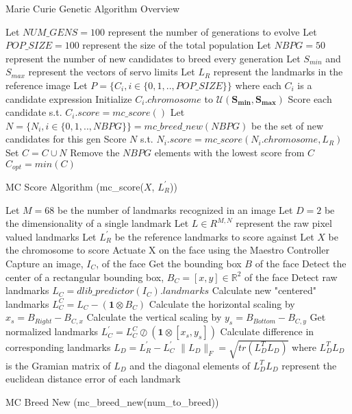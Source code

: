 \documentclass{article}
\begin{document}
\begin{algorithm}
	\caption{Marie Curie Genetic Algorithm Overview} 
    \begin{algorithmic}[1]
        \State Let $NUM\_GENS = 100$ represent the number of generations to evolve
        \State Let $POP\_SIZE = 100$ represent the size of the total population
		\State Let $NBPG = 50$ represent the number of new candidates to breed every generation
		\State Let $S_{min}$ and $S_{max}$ represent the vectors of servo limits
		\State Let $L_R$ represent the landmarks in the reference image
		\State Let $P = \{C_i, i \in \{0, 1, .., POP\_SIZE\}\}$ where each $C_i$ is a candidate expression
			\State Initialize $C_i.chromosome$ to $\mathcal{U}(\bm{S_{min}}, \bm{S_{max}})$
			\State Score each candidate s.t. $C_i.score = mc\_score()$
		\EndFor
			\State Let $N = \{N_i, i \in \{0, 1, ..,NBPG\}\} = mc\_breed\_new(NBPG)$ be the set of new candidates for this gen
			\State Score $N$ s.t. $N_i.score = mc\_score(N_i.chromosome, L_R)$
			\State Set $C = C \cup N$
			\State Remove the $NBPG$ elements with the lowest score from $C$ 
		\EndFor
		\State \Return $C_{opt} = min(C)$
	\end{algorithmic} 
\end{algorithm}

\begin{algorithm}
	\caption{MC Score Algorithm (mc\_score($X$, $L^\prime_R$))} 
	\begin{algorithmic}[1]
		\State Let $M = 68$ be the number of landmarks recognized in an image
		\State Let $D = 2$ be the dimensionality of a single landmark
		\State Let $L \in R^{M, N}$ represent the raw pixel valued landmarks
		\State Let $L^\prime_R$ be the reference landmarks to score against
		\State Let $X$ be the chromosome to score
		\State Actuate X on the face using the Maestro Controller
		\State Capture an image, $I_C$, of the face
		\State Get the bounding box $B$ of the face
		\State Detect the center of a rectangular bounding box, $B_C = [x, y] \in \mathbb{R}^2$ of the face
		\State Detect raw landmarks $L_C = dlib\_predictor(I_C).landmarks$
		\State Calculate new "centered" landmarks $L^C_C = L_C - (\mathbf{1} \otimes B_C)$
		\State Calculate the horizontal scaling by $x_s = B_{Right} - B_{C, x}$
		\State Calculate the vertical scaling by $y_s = B_{Bottom} - B_{C, y}$
		\State Get normalized landmarks $L^\prime_C = L^C_C \oslash (\mathbf{1} \otimes [x_s, y_s])$
		\State Calculate difference in corresponding landmarks $L_D = L^\prime_R - L^\prime_C$
		\State \Return $\| L_D \|_F = \sqrt{tr(L^T_DL_D)}$ where $L^T_DL_D$ is the Gramian matrix of $L_D$ and the diagonal elements of $L^T_DL_D$ represent the euclidean distance error of each landmark
	\end{algorithmic}
\end{algorithm}

\begin{algorithm}
	\caption{MC Breed New (mc\_breed\_new(num\_to\_breed))}
	\begin{algorithmic}[1]
		\State
	\end{algorithmic} 
\end{algorithm} 
\end{document}
